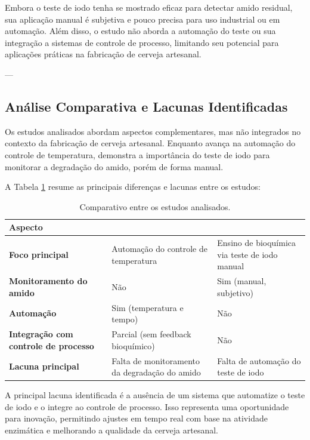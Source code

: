 Embora o teste de iodo tenha se mostrado eficaz para detectar amido residual, sua aplicação manual é subjetiva e pouco precisa para uso industrial ou em automação. Além disso, o estudo não aborda a automação do teste ou sua integração a sistemas de controle de processo, limitando seu potencial para aplicações práticas na fabricação de cerveja artesanal.

---

\subsection{Análise Comparativa e Lacunas Identificadas}
Os estudos analisados abordam aspectos complementares, mas não integrados no contexto da fabricação de cerveja artesanal. Enquanto \cite{parizotto2017} avança na automação do controle de temperatura, \cite{almeida2024} demonstra a importância do teste de iodo para monitorar a degradação do amido, porém de forma manual.

A Tabela \ref{tab:comparativo} resume as principais diferenças e lacunas entre os estudos:

\begin{table}[h]
\centering
\caption{Comparativo entre os estudos analisados.}
\label{tab:comparativo}
\begin{tabular}{|p{5cm}|p{5cm}|p{5cm}|}
\hline
\textbf{Aspecto} & \textbf{\cite{parizotto2017}} & \textbf{\cite{almeida2024}} \\ \hline
\textbf{Foco principal} & Automação do controle de temperatura & Ensino de bioquímica via teste de iodo manual \\ \hline
\textbf{Monitoramento do amido} & Não & Sim (manual, subjetivo) \\ \hline
\textbf{Automação} & Sim (temperatura e tempo) & Não \\ \hline
\textbf{Integração com controle de processo} & Parcial (sem feedback bioquímico) & Não \\ \hline
\textbf{Lacuna principal} & Falta de monitoramento da degradação do amido & Falta de automação do teste de iodo \\ \hline
\end{tabular}
\end{table}

A principal lacuna identificada é a ausência de um sistema que automatize o teste de iodo e o integre ao controle de processo. Isso representa uma oportunidade para inovação, permitindo ajustes em tempo real com base na atividade enzimática e melhorando a qualidade da cerveja artesanal.

